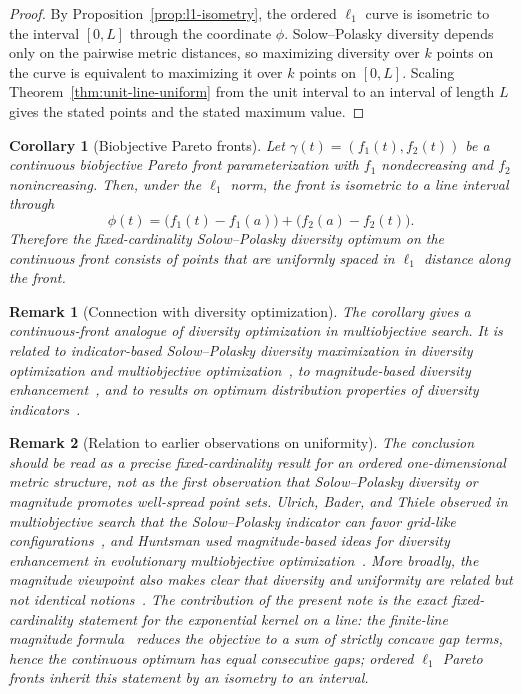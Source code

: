 \documentclass[12pt,a4paper]{article}
\newtheorem{corollary}{Corollary}
\newtheorem{remark}{Remark}
\begin{document}
\begin{proof}
By Proposition~\ref{prop:l1-isometry}, the ordered $\ell_1$ curve is isometric to the interval $[0,L]$ through the coordinate $\phi$.  Solow--Polasky diversity depends only on the pairwise metric distances, so maximizing diversity over $k$ points on the curve is equivalent to maximizing it over $k$ points on $[0,L]$.  Scaling Theorem~\ref{thm:unit-line-uniform} from the unit interval to an interval of length $L$ gives the stated points and the stated maximum value.
\end{proof}

\begin{corollary}[Biobjective Pareto fronts]
\label{cor:biobjective-pareto-fronts}
Let $\gamma(t)=(f_1(t),f_2(t))$ be a continuous biobjective Pareto front parameterization with $f_1$ nondecreasing and $f_2$ nonincreasing.  Then, under the $\ell_1$ norm, the front is isometric to a line interval through
\[
 \phi(t)=\bigl(f_1(t)-f_1(a)\bigr)+\bigl(f_2(a)-f_2(t)\bigr).
\]
Therefore the fixed-cardinality Solow--Polasky diversity optimum on the continuous front consists of points that are uniformly spaced in $\ell_1$ distance along the front.
\end{corollary}



\begin{remark}[Connection with diversity optimization]
The corollary gives a continuous-front analogue of diversity optimization in multiobjective search.  It is related to indicator-based Solow--Polasky diversity maximization in diversity optimization and multiobjective optimization~\cite{UlrichBaderThiele2010}, to magnitude-based diversity enhancement~\cite{Huntsman2023}, and to results on optimum distribution properties of diversity indicators~\cite{PereverdievaEtAl2025,Nezhadmoghaddam2026riesz}.
\end{remark}



\begin{remark}[Relation to earlier observations on uniformity]
The conclusion should be read as a precise fixed-cardinality result for an ordered one-dimensional metric structure, not as the first observation that Solow--Polasky diversity or magnitude promotes well-spread point sets.  Ulrich, Bader, and Thiele observed in multiobjective search that the Solow--Polasky indicator can favor grid-like configurations~\cite{UlrichBaderThiele2010}, and Huntsman used magnitude-based ideas for diversity enhancement in evolutionary multiobjective optimization~\cite{Huntsman2023}.  More broadly, the magnitude viewpoint also makes clear that diversity and uniformity are related but not identical notions~\cite{LeinsterMeckes2016,Huntsman2023}.  The contribution of the present note is the exact fixed-cardinality statement for the exponential kernel on a line: the finite-line magnitude formula~\cite{LeinsterWillerton2009} reduces the objective to a sum of strictly concave gap terms, hence the continuous optimum has equal consecutive gaps; ordered $\ell_1$ Pareto fronts inherit this statement by an isometry to an interval.
\end{remark}
\end{document}
